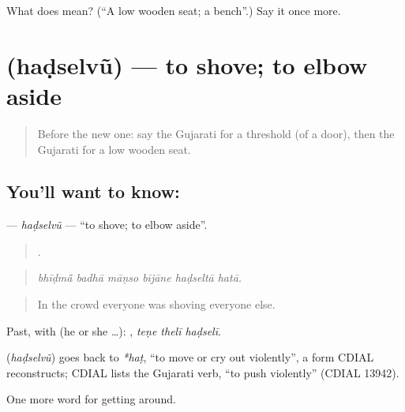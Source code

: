 \begin{tcolorbox}[breakable,colback=teal!4,colframe=teal!35!black,title={Before you move on}]
What does  mean? (\textquotedblleft{}A low wooden seat; a bench\textquotedblright{}.) Say it once more.
\end{tcolorbox}
\section[\texorpdfstring{\gu{હડસેલવું} (haḍselvũ)}{હડસેલવું (haḍselvũ)}]{ (haḍselvũ) — to shove; to elbow aside}

\label{lesson:GU-C397-hadselvu}



\begin{quote}
Before the new one: say the Gujarati for a threshold (of a door), then the Gujarati for a low wooden seat.
\end{quote}

\subsection*{You'll want to know: }
\textbf{} — \emph{haḍselvũ} — \textquotedblleft{}to shove; to elbow aside\textquotedblright{}.

\begin{quote}
     .
\end{quote}

\begin{quote}
\emph{bhīḍmā̃ badhā māṇso bījāne haḍseltā hatā.}
\end{quote}

\begin{quote}
In the crowd everyone was shoving everyone else.
\end{quote}

Past, with  (he or she …):   , \emph{teṇe thelī haḍselī}.

\begin{cousinweb}
\textbf{} (\emph{haḍselvũ}) goes back to \emph{*haṭ}, \textquotedblleft{}to move or cry out violently\textquotedblright{}, a form CDIAL reconstructs; CDIAL lists the Gujarati verb, \textquotedblleft{}to push violently\textquotedblright{} (CDIAL 13942).
\end{cousinweb}

\begin{grammarlens}[title={What you've built}]
One more word for getting around.
\end{grammarlens}

